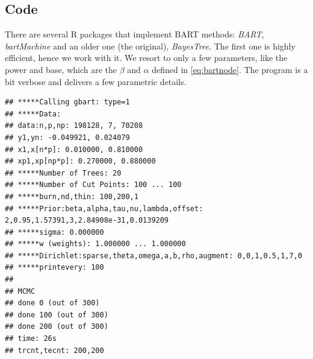 \documentclass[]{krantz}
\makeatletter
\newenvironment{Shaded}{\begin{snugshade}}{\end{snugshade}}
\newcommand{\CommentTok}[1]{\textcolor[rgb]{0.37,0.37,0.37}{\textit{#1}}}
\newcommand{\DataTypeTok}[1]{\textcolor[rgb]{0.27,0.27,0.27}{#1}}
\newcommand{\DecValTok}[1]{\textcolor[rgb]{0.06,0.06,0.06}{#1}}
\newcommand{\FloatTok}[1]{\textcolor[rgb]{0.06,0.06,0.06}{#1}}
\newcommand{\KeywordTok}[1]{\textcolor[rgb]{0.27,0.27,0.27}{\textbf{#1}}}
\newcommand{\NormalTok}[1]{#1}
\newcommand{\OperatorTok}[1]{\textcolor[rgb]{0.43,0.43,0.43}{\textbf{#1}}}
\newcommand{\StringTok}[1]{\textcolor[rgb]{0.5,0.5,0.5}{#1}}
\newenvironment{kframe}{%
\medskip{}
\setlength{\fboxsep}{.8em}
 \def\at@end@of@kframe{}%
 \ifinner\ifhmode%
  \def\at@end@of@kframe{\end{minipage}}%
  \begin{minipage}{\columnwidth}%
 \fi\fi%
 \def\FrameCommand##1{\hskip\@totalleftmargin \hskip-\fboxsep
 \colorbox{shadecolor}{##1}\hskip-\fboxsep
     \hskip-\linewidth \hskip-\@totalleftmargin \hskip\columnwidth}%
 \MakeFramed {\advance\hsize-\width
   \@totalleftmargin\z@ \linewidth\hsize
   \@setminipage}}%
 {\par\unskip\endMakeFramed%
 \at@end@of@kframe}
\renewenvironment{Shaded}{\begin{kframe}}{\end{kframe}}
\theoremstyle{definition}
\theoremstyle{definition}
\theoremstyle{definition}
\theoremstyle{remark}
\makeatother
\begin{document}
\hypertarget{code}{%
\subsection{Code}\label{code}}

There are several R packages that implement BART methods: \emph{BART},
\emph{bartMachine} and an older one (the original), \emph{BayesTree}.
The first one is highly efficient, hence we work with it. We resort to
only a few parameters, like the power and base, which are the \(\beta\)
and \(\alpha\) defined in \eqref{eq:bartnode}. The program is a bit
verbose and delivers a few parametric details.

\footnotesize

\begin{Shaded}
\end{Shaded}

\begin{verbatim}
## *****Calling gbart: type=1
## *****Data:
## data:n,p,np: 198128, 7, 70208
## y1,yn: -0.049921, 0.024079
## x1,x[n*p]: 0.010000, 0.810000
## xp1,xp[np*p]: 0.270000, 0.880000
## *****Number of Trees: 20
## *****Number of Cut Points: 100 ... 100
## *****burn,nd,thin: 100,200,1
## *****Prior:beta,alpha,tau,nu,lambda,offset: 2,0.95,1.57391,3,2.84908e-31,0.0139209
## *****sigma: 0.000000
## *****w (weights): 1.000000 ... 1.000000
## *****Dirichlet:sparse,theta,omega,a,b,rho,augment: 0,0,1,0.5,1,7,0
## *****printevery: 100
## 
## MCMC
## done 0 (out of 300)
## done 100 (out of 300)
## done 200 (out of 300)
## time: 26s
## trcnt,tecnt: 200,200
\end{verbatim}
\end{document}
